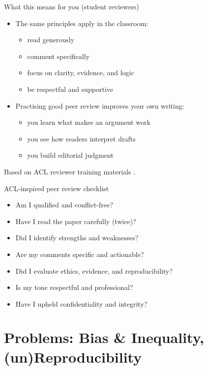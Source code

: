 \documentclass[aspectratio=169]{beamer}
\begin{document}
\begin{frame}{What this means for you (student reviewers)}
\begin{itemize}
  \item The same principles apply in the classroom:
    \begin{itemize}
      \item read generously
      \item comment specifically
      \item focus on clarity, evidence, and logic
      \item be respectful and supportive
    \end{itemize}
  \item Practising good peer review improves your own writing:
    \begin{itemize}
      \item you learn what makes an argument work
      \item you see how readers interpret drafts
      \item you build editorial judgment
    \end{itemize}
\end{itemize}
\medskip
\small  Based on ACL reviewer training materials \citep{acl2023reviewbasics, aclarrguidelines, aclcopr2023}.
\end{frame}


\begin{frame}{ACL-inspired peer review checklist}
\begin{itemize}
  \item Am I qualified and conflict-free?
  \item Have I read the paper carefully (twice)?
  \item Did I identify strengths and weaknesses?
  \item Are my comments specific and actionable?
  \item Did I evaluate ethics, evidence, and reproducibility?
  \item Is my tone respectful and professional?
  \item Have I upheld confidentiality and integrity?
\end{itemize}

\end{frame}



\section{Problems: Bias \& Inequality, (un)Reproducibility}
\end{document}
